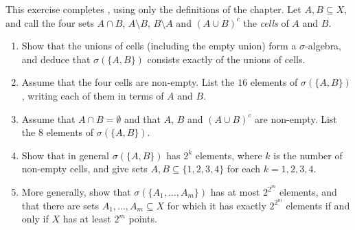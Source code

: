 
\begin{exercise}\label{ex:sa-two-sets}
\easy This exercise completes , using only the definitions of the
chapter. Let $A,B\subseteq X$, and call the four sets $A\cap B$, $A\setminus B$, $B\setminus A$ and
$(A\cup B)^c$ the \emph{cells} of $A$ and $B$.
\begin{enumerate}[label=(\alph*)]
  \item Show that the unions of cells (including the empty union) form a $\sigma$-algebra, and
    deduce that $\sigma(\{A,B\})$ consists exactly of the unions of cells.
  \item Assume that the four cells are non-empty. List the $16$ elements of $\sigma(\{A,B\})$,
    writing each of them in terms of $A$ and $B$.
  \item Assume that $A\cap B=\emptyset$ and that $A$, $B$ and $(A\cup B)^c$ are non-empty. List
    the $8$ elements of $\sigma(\{A,B\})$.
  \item Show that in general $\sigma(\{A,B\})$ has $2^k$ elements, where $k$ is the number of
    non-empty cells, and give sets $A,B\subseteq\{1,2,3,4\}$ for each $k=1,2,3,4$.
  \item More generally, show that $\sigma(\{A_1,\dots,A_m\})$ has at most $2^{2^m}$ elements, and
    that there are sets $A_1,\dots,A_m\subseteq X$ for which it has exactly $2^{2^m}$ elements if
    and only if $X$ has at least $2^m$ points.
\end{enumerate}
\end{exercise}

